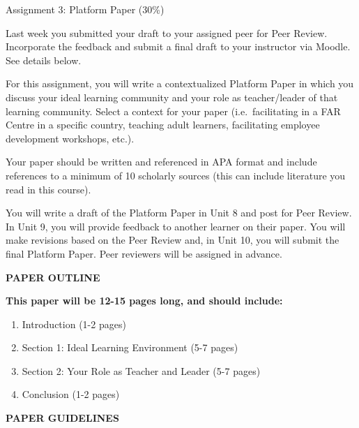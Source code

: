 \documentclass[
]{book}
\providecommand{\tightlist}{%
  \setlength{\itemsep}{0pt}\setlength{\parskip}{0pt}}
\begin{document}
\begin{assessment}
{Assignment 3: Platform Paper (30\%)}

Last week you submitted your draft to your assigned peer for Peer Review. Incorporate the feedback and submit a final draft to your instructor via Moodle. See details below.

For this assignment, you will write a contextualized Platform Paper in which you discuss your ideal learning community and your role as teacher/leader of that learning community. Select a context for your paper (i.e.~facilitating in a FAR Centre in a specific country, teaching adult learners, facilitating employee development workshops, etc.).

Your paper should be written and referenced in APA format and include references to a minimum of 10 scholarly sources (this can include literature you read in this course).

You will write a draft of the Platform Paper in Unit 8 and post for Peer Review. In Unit 9, you will provide feedback to another learner on their paper. You will make revisions based on the Peer Review and, in Unit 10, you will submit the final Platform Paper. Peer reviewers will be assigned in advance.

\textbf{PAPER OUTLINE}

\textbf{This paper will be 12-15 pages long, and should include:}

\begin{enumerate}
\def\labelenumi{\arabic{enumi}.}
\tightlist
\item
  Introduction (1-2 pages)
\item
  Section 1: Ideal Learning Environment (5-7 pages)
\item
  Section 2: Your Role as Teacher and Leader (5-7 pages)
\item
  Conclusion (1-2 pages)
\end{enumerate}

\textbf{PAPER GUIDELINES}


\end{assessment}
\end{document}
